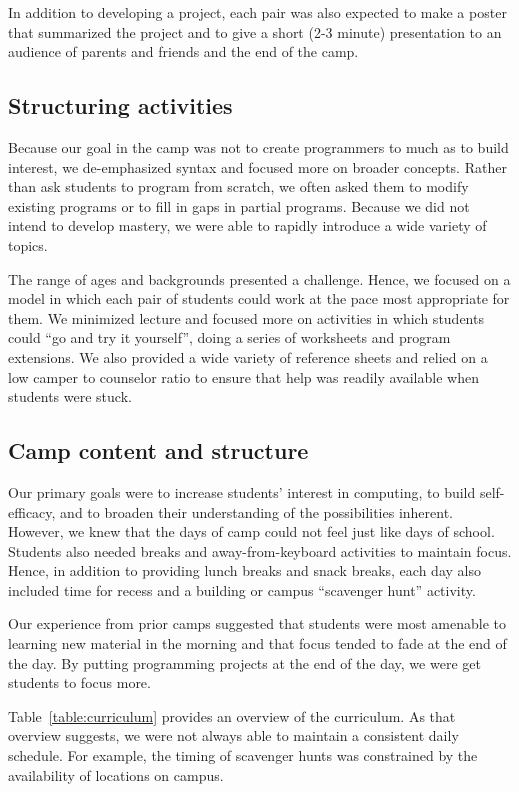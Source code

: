 In addition to developing a project, each pair was also expected to make
a poster that summarized the project and to give a short (2-3 minute)
presentation to an audience of parents and friends and the end of the
camp.

\subsection{Structuring activities}

Because our goal in the camp was not to create programmers to much as
to build interest, we de-emphasized syntax and focused more on broader
concepts.  Rather than ask students to program from scratch, we often
asked them to modify existing programs or to fill in gaps in partial
programs.  Because we did not intend to develop mastery, we were
able to rapidly introduce a wide variety of topics.

The range of ages and backgrounds presented a challenge.  Hence,
we focused on a model in which each pair of students could work at the
pace most appropriate for them.  We minimized lecture and focused more
on activities in which students could ``go and try it yourself'', doing
a series of worksheets and program extensions.  We also provided a wide
variety of reference sheets and relied on a low camper to counselor
ratio to ensure that help was readily available when students were stuck.

\subsection{Camp content and structure}

Our primary goals were to increase students' interest in computing,
to build self-efficacy, and to broaden their understanding of the
possibilities inherent.  However, we knew that the days of camp
could not feel just like days of school.  Students also needed
breaks and away-from-keyboard activities to maintain focus. Hence,
in addition to providing lunch breaks and snack breaks, each day
also included time for recess and a building or campus ``scavenger
hunt'' activity.

Our experience from prior camps suggested that students were most
amenable to learning new material in the morning and that focus
tended to fade at the end of the day.  By putting programming
projects at the end of the day, we were get students to focus more.

Table~\ref{table:curriculum} provides an overview of the curriculum.
As that overview suggests, we were not always able to maintain a
consistent daily schedule.  For example, the timing of scavenger
hunts was constrained by the availability of locations on campus.

